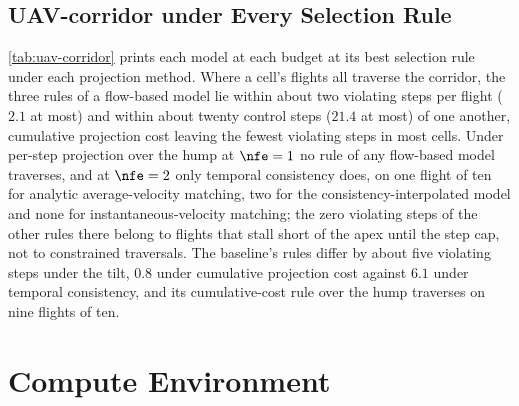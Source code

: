 \FloatBarrier

\section{UAV-corridor under Every Selection Rule}\label{app:uav-corridor-rules}

\autoref{tab:uav-corridor} prints each model at each budget at its best selection rule under each
projection method. Where a cell's flights all traverse the corridor, the three rules of a flow-based
model lie within about two violating steps per flight ($2.1$ at most) and within about twenty control
steps ($21.4$ at most) of one another, cumulative projection cost leaving the fewest violating steps in
most cells. Under per-step projection over the hump at $\nfe = 1$ no rule of any flow-based model
traverses, and at $\nfe = 2$ only temporal consistency does, on one flight of ten for analytic
average-velocity matching, two for the consistency-interpolated model and none for
instantaneous-velocity matching; the zero violating steps of the other rules there belong to flights
that stall short of the apex until the step cap, not to constrained traversals. The baseline's rules
differ by about five violating steps under the tilt, $0.8$ under cumulative projection cost against
$6.1$ under temporal consistency, and its cumulative-cost rule over the hump traverses on nine flights
of ten.
\ifappendixfull

\else
\label{tab:app:uav-corridor-tilt-ps}\label{tab:app:uav-corridor-tilt-ep}\label{tab:app:uav-corridor-hump-ps}\label{tab:app:uav-corridor-hump-ep}
\fi

\FloatBarrier



\chapter{Compute Environment}\label{app:repro}\label{app:compute}

